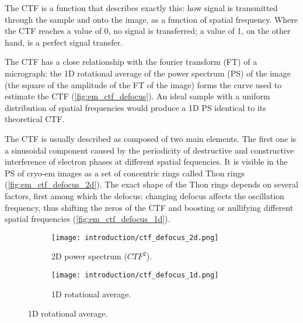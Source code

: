 The CTF is a function that describes exactly this: how signal is transmitted through the sample and onto the image, as a function of spatial frequency.
Where the CTF reaches a value of 0, no signal is transferred; a value of 1, on the other hand, is a perfect signal transfer.

The CTF has a close relationship with the fourier transform (FT) of a micrograph: the 1D rotational average of the power spectrum (PS) of the image (the square of the amplitude of the FT of the image) forms the curve used to estimate the CTF (\autoref{fig:em_ctf_defocus}).
An ideal sample with a uniform distribution of spatial frequencies would produce a 1D PS identical to its theoretical CTF.

The CTF is usually described as composed of two main elements.
The first one is a sinusoidal component caused by the periodicity of destructive and constructive interference of electron phases at different spatial fequencies.
It is visible in the PS of cryo-em images as a set of concentric rings called Thon rings (\autoref{fig:em_ctf_defocus_2d}).
The exact shape of the Thon rings depends on several factors, first among which the defocus: changing defocus affects the oscillation frequency, thus shifting the zeros of the CTF and boosting or nullifying different spatial frequencies (\autoref{fig:em_ctf_defocus_1d}).

\begin{figure}[ht]
    \centering
    \begin{subfigure}{\textwidth}
        \centering
        \texttt{[image: introduction/ctf\_defocus\_2d.png]}
        \caption{2D power spectrum ($CTF^2$).}
        \label{fig:em_ctf_defocus_2d}
    \end{subfigure}%

    \begin{subfigure}{\textwidth}
        \centering
        \texttt{[image: introduction/ctf\_defocus\_1d.png]}
        \caption{1D rotational average.}
        \label{fig:em_ctf_defocus_1d}
    \end{subfigure}%

    \label{fig:em_ctf_defocus}
\end{figure}

